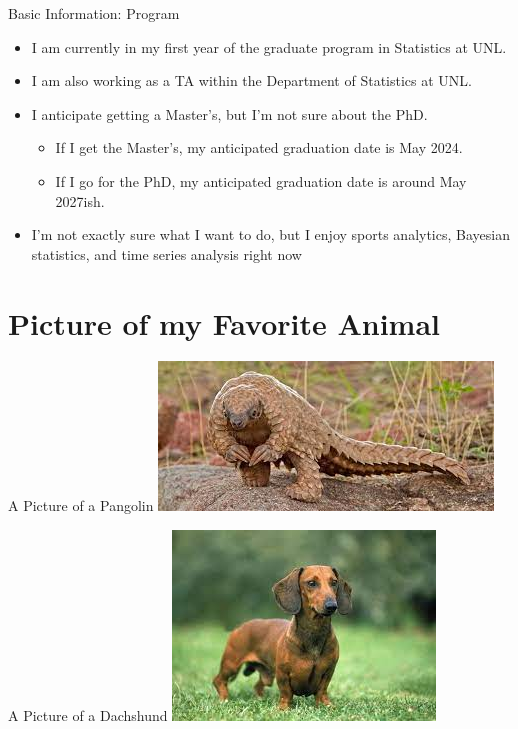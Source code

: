 \documentclass{beamer}\usepackage[]{graphicx}\usepackage[]{graphicx}\usepackage[]{xcolor}
\begin{document}
\begin{frame}{Basic Information: Program}
  \begin{itemize}
    \item I am currently in my first year of the graduate program in Statistics at UNL.
      \item I am also working as a TA within the Department of Statistics at UNL.
        \item I anticipate getting a Master's, but I'm not sure about the PhD.
        \begin{itemize}
          \item If I get the Master's, my anticipated graduation date is May 2024.
            \item If I go for the PhD, my anticipated graduation date is around May 2027ish.
        \end{itemize}
          \item I'm not exactly sure what I want to do, but I enjoy sports analytics, Bayesian statistics, and time series analysis right now
  \end{itemize}
\end{frame}


\section{Picture of my Favorite Animal}

\begin{frame}{A Picture of a Pangolin}
\includegraphics[]{pangolinpicture.jpg}
\end{frame}

\begin{frame}{A Picture of a Dachshund}
\includegraphics[]{wienerdog.jpg}
\end{frame}
\end{document}
